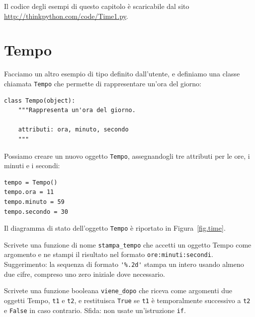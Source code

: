 \documentclass[10pt]{book}
\begin{document}
Il codice degli esempi di questo capitolo è scaricabile dal sito
\url{http://thinkpython.com/code/Time1.py}.

\section{Tempo}
\label{time.object}

Facciamo un altro esempio di tipo definito dall'utente, e definiamo una classe chiamata {\tt Tempo} che permette di rappresentare un'ora del giorno:

\begin{verbatim}
class Tempo(object):
    """Rappresenta un'ora del giorno.
       
    attributi: ora, minuto, secondo
    """
\end{verbatim}
%
Possiamo creare un nuovo oggetto {\tt Tempo}, assegnandogli tre attributi per le
ore, i minuti e i secondi:

\begin{verbatim}
tempo = Tempo()
tempo.ora = 11
tempo.minuto = 59
tempo.secondo = 30
\end{verbatim}
%
Il diagramma di stato dell'oggetto {\tt Tempo} è riportato in Figura~\ref{fig.time}.

\vspace{0.2in}
\begin{exercise}
\label{ex.printtime}

Scrivete una funzione di nome \verb"stampa_tempo" che accetti un oggetto
Tempo come argomento e ne stampi il risultato nel formato {\tt ore:minuti:secondi}.
Suggerimento: la sequenza di formato \verb"'%.2d'" stampa un intero usando almeno due cifre, compreso uno zero iniziale dove necessario.

\end{exercise}

\vspace{0.2in}
\begin{exercise}
\label{isafter}

Scrivete una funzione booleana \verb"viene_dopo" che riceva come argomenti due oggetti Tempo, {\tt t1} e {\tt t2}, e restituisca {\tt True} se {\tt t1} è temporalmente successivo a {\tt t2} e {\tt False} in caso contrario.  Sfida: non usate un'istruzione {\tt if}.
\end{exercise}
\end{document}
